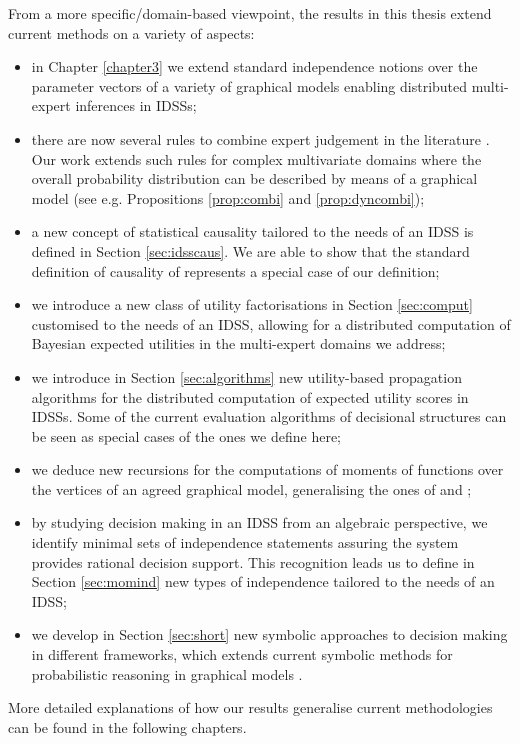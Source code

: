 From a more specific/domain-based viewpoint, the results in this thesis extend current methods on a variety of aspects:
\begin{itemize}
\item in Chapter \ref{chapter3} we extend standard independence notions over the parameter vectors of a variety of graphical models \citep[see e.g.][]{Spiegelhalter1990,Dawid1993, Freeman2011} enabling distributed multi-expert inferences in IDSSs;
\item there are now several rules to combine expert judgement in the literature \citep[see e.g.][]{French2011}. Our work extends such rules for complex multivariate domains where the overall probability distribution can be described by means of a graphical model (see e.g. Propositions \ref{prop:combi} and \ref{prop:dyncombi});
\item a new concept of statistical causality tailored to the needs of an IDSS is defined in Section \ref{sec:idsscaus}. We are able to show that the standard definition of causality of \citet{Pearl2000} represents a special case of our definition;
\item we introduce a new class of utility factorisations in Section \ref{sec:comput} customised to the needs of an IDSS, allowing for a distributed computation of Bayesian expected utilities in the multi-expert domains we address;
\item we  introduce in Section \ref{sec:algorithms} new utility-based propagation algorithms for the distributed computation of expected utility scores in IDSSs. Some of the current evaluation algorithms of decisional structures can be seen as special cases of the ones we define here;
\item we deduce new recursions for the computations of moments of functions over the vertices of an agreed graphical model, generalising the ones of \citet{Cowell1999a} and \citet{Nilsson2001};
\item by studying decision making in an IDSS from an algebraic perspective, we identify minimal sets of independence statements assuring the system provides rational decision support. This recognition leads us to define in Section \ref{sec:momind} new types of independence tailored to the needs of an IDSS; 
\item we develop in Section \ref{sec:short} new symbolic approaches to decision making in different frameworks, which extends current symbolic methods for probabilistic reasoning in graphical models \citep[see e.g.][]{Castillo1997, Darwiche2003}.
\end{itemize}
More detailed explanations of how our results generalise current methodologies can be found in the following chapters. 

